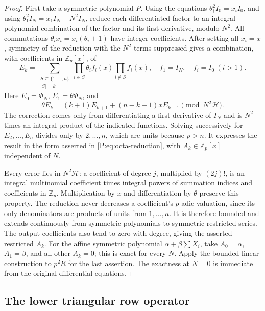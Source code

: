\documentclass[11pt,a4paper]{article}
\theoremstyle{definition}\newtheorem{definition}[theorem]{Definition}
\theoremstyle{remark}\newtheorem{remark}[theorem]{Remark}
\numberwithin{equation}{section}
\begin{document}
\begin{proof}
First take a symmetric polynomial \(P\).
Using the equations \(\theta_i^2I_0=x_iI_0\), and using
\(\theta_1^2I_N=x_1I_N+N^2I_N\), reduce each differentiated
factor to an integral polynomial combination of the factor and
its first derivative, modulo \(N^2\).
All commutations \(\theta_i x_i=x_i(\theta_i+1)\) have
integer coefficients.  After setting all \(x_i=x\), symmetry
of the reduction with the \(N^2\) terms suppressed gives a
combination, with coefficients in \(\mathbb Z_p[x]\), of
\[
 E_k=\sum_{\substack{S\subseteq\{1,\ldots,n\}\\|S|=k}}
       \prod_{i\in S}\theta_i f_i(x)
       \prod_{i\notin S}f_i(x),
 \quad f_1=I_N,\quad f_i=I_0\ (i>1).
\]
Here \(E_0=\Phi_N\), \(E_1=\theta\Phi_N\), and
\[
 \theta E_k=(k+1)E_{k+1}+(n-k+1)xE_{k-1}
                   \pmod{N^2\mathcal H}.
\]
The correction comes only from differentiating a first derivative
of \(I_N\) and is \(N^2\) times an integral product of
the indicated functions.  Solving successively for
\(E_2,\ldots,E_n\) divides only by \(2,\ldots,n\),
which are units because \(p>n\).
It expresses the result in the form asserted in
\eqref{P:eq:octa-reduction}, with \(A_k\in\mathbb Z_p[x]\)
independent of \(N\).

Every error lies in \(N^2\mathcal H\): a coefficient of
degree \(j\), multiplied by \((2j)!\), is an integral
multinomial coefficient times integral powers of summation
indices and coefficients in \(\mathbb Z_p\).
Multiplication by \(x\) and differentiation by \(\theta\)
preserve this property.  The reduction never decreases a
coefficient's \(p\)-adic valuation, since its only denominators
are products of units from \(1,\ldots,n\).
It is therefore bounded and extends continuously from symmetric
polynomials to symmetric restricted series.  The output
coefficients also tend to zero with degree, giving the asserted
restricted \(A_k\).
For the affine symmetric polynomial
\(\alpha+\beta\sum X_i\), take
\(A_0=\alpha\), \(A_1=\beta\), and all other
\(A_k=0\); this is exact for every \(N\).
Apply the bounded linear construction to \(p^2R\) for the
last assertion.  The exactness at \(N=0\) is immediate from
the original differential equations.
\end{proof}

\clearpage
\subsection{The lower triangular row operator}
\end{document}
